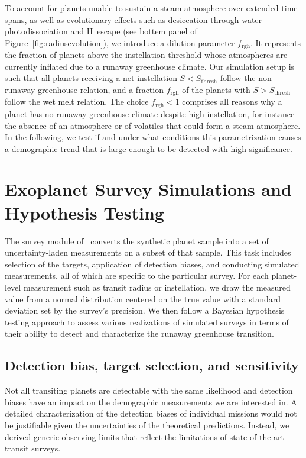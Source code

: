 \documentclass[twocolumn,twocolappendix]{aastex631}
\begin{document}
To account for planets unable to sustain a steam atmosphere over extended time spans, as well as evolutionary effects such as desiccation through water photodissociation and H~escape (see bottem panel of Figure~\ref{fig:radiusevolution}), we introduce a dilution parameter $f_\mathrm{rgh}$.
It represents the fraction of planets above the instellation threshold whose atmospheres are currently inflated due to a runaway greenhouse climate.
Our simulation setup is such that all planets receiving a net instellation $S < S_\mathrm{thresh}$ follow the non-runaway greenhouse relation, and a fraction $f_\mathrm{rgh}$ of the planets with $S > S_\mathrm{thresh}$ follow the wet melt relation.
The choice $f_\mathrm{rgh} < 1$ comprises all reasons why a planet has no runaway greenhouse climate despite high instellation, for instance the absence of an atmosphere or of volatiles that could form a steam atmosphere.
In the following, we test if and under what conditions this parametrization causes a demographic trend that is large enough to be detected with high significance.


\section{Exoplanet Survey Simulations and Hypothesis Testing}\label{sec:met_surveys-hypotests}
The survey module of \bioverse\ converts the synthetic planet sample into a set of uncertainty-laden measurements on a subset of that sample.
This task includes selection of the targets, application of detection biases, and conducting simulated measurements, all of which are specific to the particular survey.
For each planet-level measurement such as transit radius or instellation, we draw the measured value from a normal distribution centered on the true value with a standard deviation set by the survey's precision.
We then follow a Bayesian hypothesis testing approach to assess various realizations of simulated surveys in terms of their ability to detect and characterize the runaway greenhouse transition.

\subsection{Detection bias, target selection, and sensitivity}\label{sec:sensitivity} %
Not all transiting planets are detectable with the same likelihood and detection biases have an impact on the demographic measurements we are interested in.
A detailed characterization of the detection biases of individual missions would not be justifiable given the uncertainties of the theoretical predictions.
Instead, we derived generic observing limits that reflect the limitations of state-of-the-art transit surveys.
\end{document}
